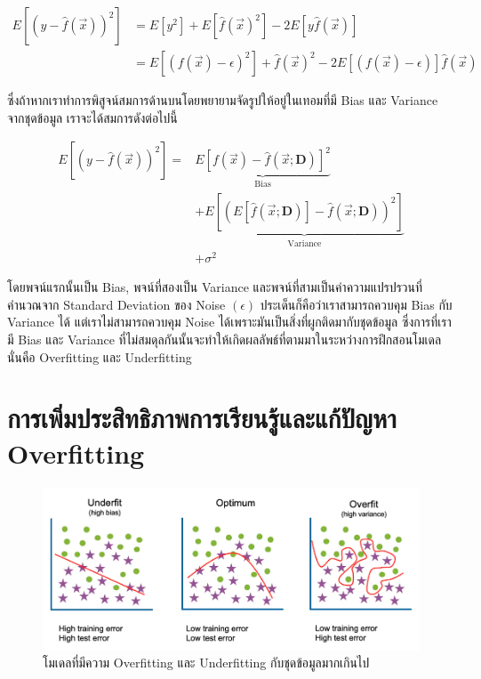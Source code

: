 \begin{align}
    E\left[\left(y - \hat{f}(\vec{x})\right)^2\right] &= 
    E\left[y^2\right] + E\left[\hat{f}(\vec{x})^2\right] - 2 E\left[y\hat{f}(\vec{x})\right] \\
    &= E\left[\left(f(\vec{x}) - \epsilon\right)^2\right] + \hat{f}(\vec{x})^2 - 2 E\left[\left(f(\vec{x}) - 
    \epsilon\right)\right]\hat{f}(\vec{x})
\end{align}

\noindent ซึ่งถ้าหากเราทำการพิสูจน์สมการด้านบนโดยพยายามจัดรูปให้อยู่ในเทอมที่มี Bias และ Variance จากชุดข้อมูล เราจะได้สมการดังต่อไปนี้

\begin{align}\label{eq:bias_variance}
E\left[\left(y - \hat{f}(\vec{x})\right)^2\right] = 
    & \underbrace{E\left[f(\vec{x}) - \hat{f}\left(\vec{x}; \bm{D}\right)\right]^2}_{\text{Bias}} \nonumber \\
    & + \underbrace{E\left[\left(E\left[\hat{f}\left(\vec{x}; \bm{D}\right)\right] - 
    \hat{f}\left(\vec{x}; \bm{D}\right)\right)^2\right]}_{\text{Variance}} \nonumber \\
    & + \sigma^2
\end{align}

โดยพจน์แรกนั้นเป็น Bias, พจน์ที่สองเป็น Variance และพจน์ที่สามเป็นค่าความแปรปรวนที่คำนวณจาก Standard Deviation ของ Noise 
$(\epsilon)$ ประเด็นก็คือว่าเราสามารถควบคุม Bias กับ Variance ได้ แต่เราไม่สามารถควบคุม Noise ได้เพราะมันเป็นสิ่งที่ผูกติดมากับชุดข้อมูล ซึ่งการที่เรามี Bias และ Variance ที่ไม่สมดุลกันนั้นจะทำให้เกิดผลลัพธ์ที่ตามมาในระหว่างการฝึกสอนโมเดล นั่นคือ Overfitting และ 
Underfitting

\section{การเพิ่มประสิทธิภาพการเรียนรู้และแก้ปัญหา Overfitting}
\label{sec:fix_overfit}

\begin{figure}[H]
    \centering
    \includegraphics[width=\linewidth]{fig/overfitting.png}
    \caption{โมเดลที่มีความ Overfitting และ Underfitting กับชุดข้อมูลมากเกินไป}
    \label{fig:overfitting}
\end{figure}

